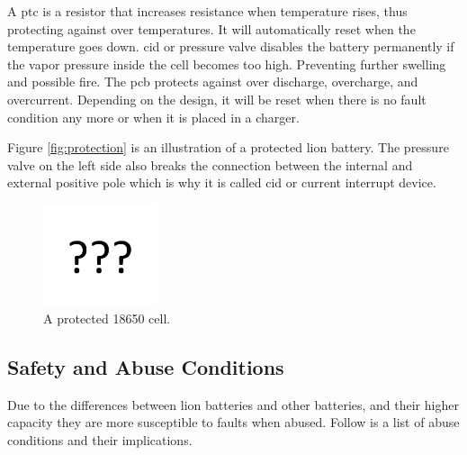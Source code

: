 A \gls{ptc} is a resistor that increases resistance when temperature rises, thus protecting against over temperatures. It will automatically reset when the temperature goes down.
\gls{cid} or pressure valve disables the battery permanently if the vapor pressure inside the cell becomes too high. Preventing further swelling and possible fire.
The \gls{pcb} protects against over discharge, overcharge, and overcurrent. Depending on the design, it will be reset when there is no fault condition any more or when it is placed in a charger.  

Figure \autoref{fig:protection} is an illustration of a protected \gls{lion} battery. The pressure valve on the left side also breaks the connection between the internal and external positive pole which is why it is called \gls{cid} or current interrupt device.

\begin{figure}[H]
	\centering
	\includegraphics[width=0.3\textwidth]{Figures/missing.png} %
	\caption{A protected 18650 cell.}
	\label{fig:protection}
\end{figure}

\subsection{Safety and Abuse Conditions}
Due to the differences between \gls{lion} batteries and other batteries, and their higher capacity they are more susceptible to faults when abused. Follow is a list of abuse conditions and their implications\cite{book35}.

